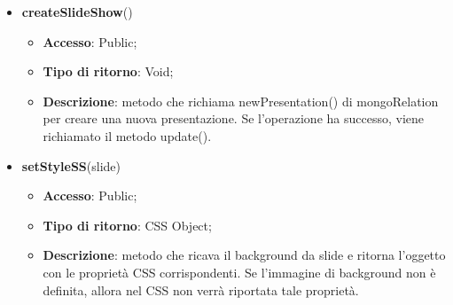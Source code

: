 {{\begin{itemize}
\begin{itemize}
			\end{itemize}
			\item \textbf{createSlideShow}()
			\begin{itemize}
				\item \textbf{Accesso}: Public;
				\item \textbf{Tipo di ritorno}: Void;
				\item \textbf{Descrizione}: metodo che richiama newPresentation() di mongoRelation per creare una nuova presentazione. Se l'operazione ha successo, viene richiamato il metodo update().
			\end{itemize}
			\item \textbf{setStyleSS}(slide)
			\begin{itemize}
				\item \textbf{Accesso}: Public;
				\item \textbf{Tipo di ritorno}: CSS Object;
				\item \textbf{Descrizione}: metodo che ricava il background da slide e ritorna l'oggetto con le proprietà CSS corrispondenti. Se l'immagine di background non è definita, allora nel CSS non verrà riportata tale proprietà.
			\end{itemize}
		\end{itemize}
		}
}
